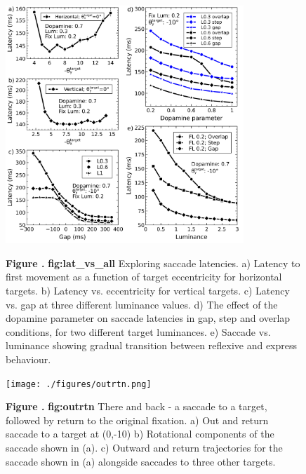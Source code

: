 \documentclass{frontiersSCNS}
\begin{document}
\begin{figure}[htb!]
\begin{center}
\includegraphics[width=0.8\textwidth]{./figures/lat_vs_everything.png}
\end{center}
\textbf{\label{fig:lat_vs_all} Figure .}
{ \textbf{fig:lat\_vs\_all} Exploring saccade latencies. a) Latency to first
movement as a function of target eccentricity for horizontal targets. b) Latency
vs. eccentricity for vertical targets. c) Latency vs. gap at three different
luminance values. d) The effect of the dopamine parameter on saccade latencies
in gap, step and overlap conditions, for two different target luminances.
e) Saccade vs. luminance showing gradual transition between reflexive and
express behaviour.}
\end{figure}

\begin{figure}[htb!]
\begin{center}
\texttt{[image: ./figures/outrtn.png]}
\end{center}
\textbf{\label{fig:outrtn} Figure .}
{ \textbf{fig:outrtn} There and back - a saccade to a target, followed by
return to
the original fixation. a) Out and return saccade to a target at (0,-10\dg)
b) Rotational components of the saccade shown in (a). c) Outward and return
trajectories for the saccade shown in (a) alongside saccades to three other
targets.}
\end{figure}
\end{document}
